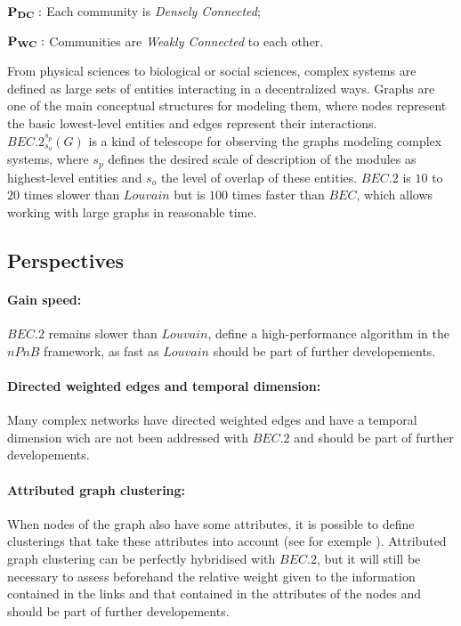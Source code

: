 \documentclass[12pt]{article}
\theoremstyle{thmstyleone}%
\theoremstyle{definition}
\begin{document}
\hspace{1cm}$\bf P_{DC}:$ Each community is {\it Densely Connected}; \vspace{-0.10cm}

\hspace{1cm}$\bf P_{WC}:$  Communities are {\it Weakly Connected} to each other.

From physical sciences to biological or social sciences, complex systems are defined as large sets of entities interacting in a decentralized ways. Graphs are one of the main conceptual structures for modeling them, where nodes represent the basic lowest-level entities and edges represent their interactions.
%
$BEC.2^{s_p}_{s_o}(G)$ is a kind of telescope for observing the graphs modeling complex systems, where $s_p$ defines the desired scale of description of the modules as highest-level entities and $s_o$ the level of overlap of these entities.
%
$BEC.2$ is $10$ to $20$ times slower than $Louvain$ but is $100$ times faster than $BEC$, which allows working with large graphs in reasonable time.

\subsection{Perspectives\label{Perspectives}}

\paragraph{Gain speed:} $BEC.2$ remains slower than $Louvain$, define a high-performance algorithm in the $nPnB$ framework, as fast as $Louvain$ should be part of further developements.

\vspace{-0.50cm}
\paragraph{Directed weighted edges and temporal dimension:}
Many complex networks have directed weighted edges and have a temporal dimension wich are not been addressed with $BEC.2$ and should be part of further developements.

\vspace{-0.50cm}
\paragraph{Attributed graph clustering:}
When nodes of the graph also have some attributes, it is possible to define clusterings that take these attributes into account  (see for exemple  \cite{cao_knowledge_2024, BERAHMAND2024127041, he2021survey, berahmand2023dac, berahmand2024sdac, su2022comprehensive, chunaev2020community, wang2022deep}). Attributed graph clustering  can be perfectly hybridised with $BEC.2$, but it will still be necessary to assess beforehand the relative weight given to the information contained in the links and that contained in the attributes of the nodes and should be part of further developements.
\end{document}
